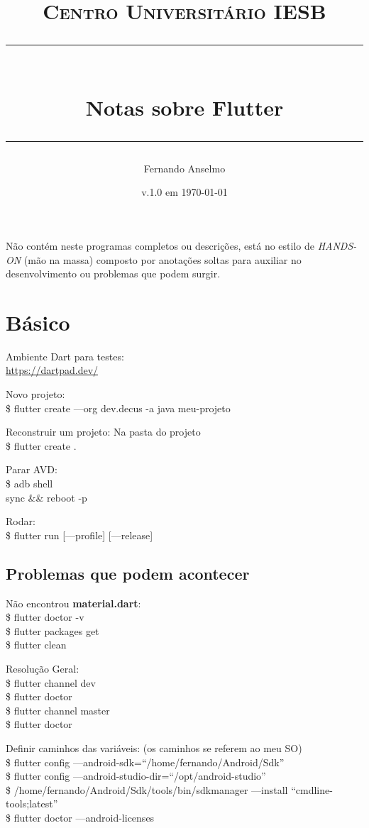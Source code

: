 \documentclass[11pt]{scrartcl}
\title{	
 \normalfont\normalsize
 \textsc{Centro Universitário IESB}\\
 \vspace{5pt} %
 \rule{\linewidth}{0.5pt}\\
 \vspace{20pt} %
 {\huge Notas sobre Flutter}\\
 \vspace{12pt} %
 \rule{\linewidth}{2pt}
}
\author{\LARGE Fernando Anselmo}
\date{v.1.0 em \normalsize\today}
\begin{document}
\maketitle

Não contém neste programas completos ou descrições, está no estilo de \textit{HANDS-ON} (mão na massa) composto por anotações soltas para auxiliar no desenvolvimento ou problemas que podem surgir.

\section{Básico}

Ambiente Dart para testes: \\
\url{https://dartpad.dev/}

Novo projeto: \\
{\ttfamily\$ flutter create ---org dev.decus -a java meu-projeto}

Reconstruir um projeto: Na pasta do projeto
\\
{\ttfamily\$ flutter create .}

Parar AVD:
\\
{\ttfamily\$ adb shell
\\
sync \&\& reboot -p}

Rodar:
\\
{\ttfamily\$ flutter run [---profile] [---release]}

\subsection{Problemas que podem acontecer}

Não encontrou \textbf{material.dart}: \\
{\ttfamily\$ flutter doctor -v} \\
{\ttfamily\$ flutter packages get} \\
{\ttfamily\$ flutter clean}

Resolução Geral:
\\
{\ttfamily\$ flutter channel dev} \\
{\ttfamily\$ flutter doctor} \\
{\ttfamily\$ flutter channel master} \\
{\ttfamily\$ flutter doctor}

Definir caminhos das variáveis: (os caminhos se referem ao meu SO) \\
{\ttfamily\$ flutter config ---android-sdk=``/home/fernando/Android/Sdk''} \\
{\ttfamily\$ flutter config ---android-studio-dir=``/opt/android-studio''} \\
{\ttfamily\$ /home/fernando/Android/Sdk/tools/bin/sdkmanager ---install ``cmdline-tools;latest''} \\
{\ttfamily\$ flutter doctor ---android-licenses}
\end{document}
